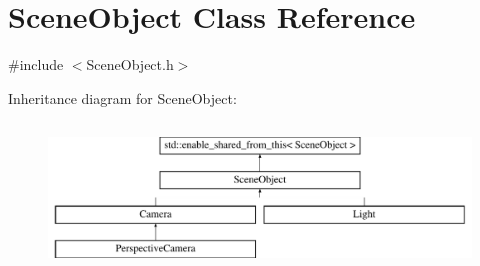 \hypertarget{class_scene_object}{}\section{Scene\+Object Class Reference}
\label{class_scene_object}


{\ttfamily \#include $<$Scene\+Object.\+h$>$}

Inheritance diagram for Scene\+Object\+:\begin{figure}[H]
\begin{center}
\leavevmode
\includegraphics[height=3.985765cm]{class_scene_object}
\end{center}
\end{figure}
